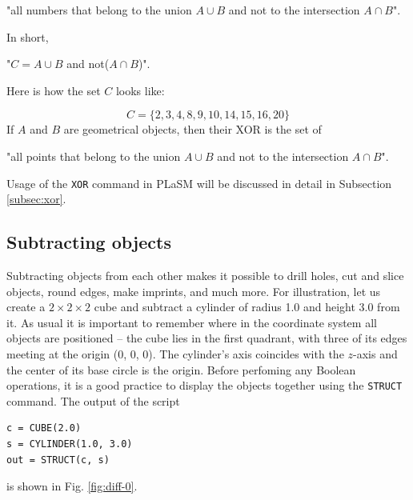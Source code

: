 \centerline{
"all numbers that belong to the union $A \cup B$ {\color{red}and not} to the intersection $A \cap B$".
}
\vspace{4mm}
\noindent
In short,\\

\centerline{
"$C = A \cup B$ {\color{red}and not}($A \cap B$)".
}
\vspace{4mm}
\noindent
Here is how the set $C$ looks like:

$$
C = \{2, 3, 4, 8, 9, 10, 14, 15, 16, 20\}
$$
If $A$ and $B$ are geometrical objects, then their XOR is the set of \\

\centerline{
"all points that belong to the union $A \cup B$ {\color{red}and not} to the intersection $A \cap B$".
}
\vspace{4mm}
\noindent
Usage of the {\tt XOR} command in PLaSM will be discussed in detail 
in Subsection \ref{subsec:xor}.


\subsection{Subtracting objects}\label{subsec:subtract}

Subtracting objects from each other makes it possible 
to drill holes, cut and slice objects, round edges, make 
imprints, and much more. 
For illustration, let us create a $2 \times 2 \times 2$ cube and subtract 
a cylinder of radius 1.0 and height 3.0 from it. As usual it is important to remember where 
in the coordinate system all objects are positioned -- the cube lies in the 
first quadrant, with three of its edges meeting at the origin (0, 0, 0).
The cylinder's axis coincides with the $z$-axis and the center of its base
circle is the origin. Before perfoming any Boolean operations, it is a good 
practice to display the objects together using the {\tt STRUCT} command. The 
output of the script

\begin{bbox}
\begin{verbatim}
c = CUBE(2.0)
s = CYLINDER(1.0, 3.0)
out = STRUCT(c, s) 
\end{verbatim}
\end{bbox}
\vspace{6mm}

\noindent
is shown in Fig. \ref{fig:diff-0}.
\newpage

